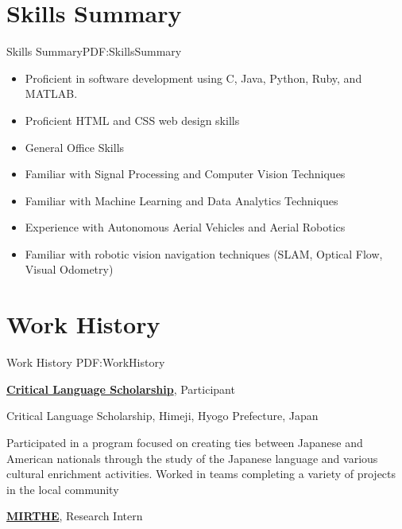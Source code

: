 \documentclass[letterpaper,10pt,oneside]{article}
\begin{document}
\begin{body}
\section{Skills Summary}{Skills Summary}{PDF:SkillsSummary}
\begin{multicols}{3}
\begin{flushleft}
\begin{itemize}
    \item Proficient in software development using C, Java, Python, Ruby, and MATLAB.
    \item Proficient HTML and CSS web design skills
    \item General Office Skills
    \item Familiar with Signal Processing and Computer Vision Techniques
    \item Familiar with Machine Learning and Data Analytics Techniques
    \item Experience with Autonomous Aerial Vehicles and Aerial Robotics
    \item Familiar with robotic vision navigation techniques (SLAM, Optical Flow, Visual Odometry)
    
\end{itemize}
\end{flushleft}
\end{multicols}
\BigGap

\section
{Work History}
{Work History}
{PDF:WorkHistory}

\href{http://clscholarship.org/}
{\textbf{Critical Language Scholarship}},
Participant

\GapNoBreak
\BulletItem
Critical Language Scholarship, Himeji, Hyogo Prefecture, Japan
\hfill
{}
\begin{detail}
\SubBulletItem
Participated in a program focused on creating ties between Japanese and American nationals through the study of the Japanese language and various cultural enrichment activities. Worked in teams completing a variety of projects in the local community

\end{detail}
\vspace{5mm}

\href{http://zondlo.princeton.edu/}
{\textbf{MIRTHE}},
Research Intern


\end{body}
\end{document}
